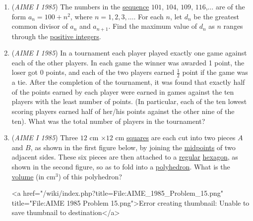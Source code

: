 \begin{enumerate}
 

	\item (\textit{AIME I 1985}) The numbers in the \href{https://artofproblemsolving.com/wiki/index.php?title=Sequence}{sequence} $101$, $104$, $109$, $116$,$\ldots$ are of the form $a_n=100+n^2$, where $n=1,2,3,\ldots$. For each $n$, let $d_n$ be the greatest common divisor of $a_n$ and $a_{n+1}$. Find the maximum value of $d_n$ as $n$ ranges through the \href{https://artofproblemsolving.com/wiki/index.php?title=Positive\_integer}{positive integers}.


 

	\item (\textit{AIME I 1985}) In a tournament each player played exactly one game against each of the other players. In each game the winner was awarded 1 point, the loser got 0 points, and each of the two players earned $\frac{1}{2}$ point if the game was a tie. After the completion of the tournament, it was found that exactly half of the points earned by each player were earned in games against the ten players with the least number of points. (In particular, each of the ten lowest scoring players earned half of her/his points against the other nine of the ten). What was the total number of players in the tournament?


 

	\item (\textit{AIME I 1985}) Three $12$ cm $\times 12$ cm \href{https://artofproblemsolving.com/wiki/index.php?title=Square\_(geometry)}{ squares} are each cut into two pieces $A$ and $B$, as shown in the first figure below, by joining the \href{https://artofproblemsolving.com/wiki/index.php?title=Midpoint}{midpoints} of two adjacent sides. These six pieces are then attached to a \href{https://artofproblemsolving.com/wiki/index.php?title=Regular\_polygon}{ regular} \href{https://artofproblemsolving.com/wiki/index.php?title=Hexagon}{hexagon}, as shown in the second figure, so as to fold into a \href{https://artofproblemsolving.com/wiki/index.php?title=Polyhedron}{polyhedron}. What is the \href{https://artofproblemsolving.com/wiki/index.php?title=Volume}{volume} (in $\mathrm{cm}^3$) of this polyhedron?


 <a href="/wiki/index.php?title=File:AIME\_1985\_Problem\_15.png" title="File:AIME 1985 Problem 15.png">Error creating thumbnail: Unable to save thumbnail to destination</a>


\end{enumerate}